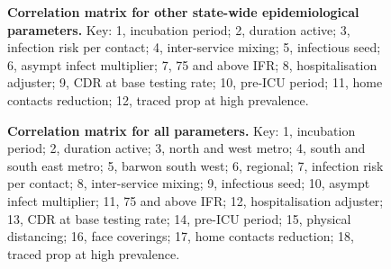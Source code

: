 \begin{figure}[ht]
\caption{\textbf{Correlation matrix for other state-wide epidemiological parameters.} Key: 1, incubation period; 2, duration active; 3, infection risk per contact; 4, inter-service mixing; 5, infectious seed; 6, asympt infect multiplier; 7, 75 and above IFR; 8, hospitalisation adjuster; 9, CDR at base testing rate; 10, pre-ICU period; 11, home contacts reduction; 12, traced prop at high prevalence.}
\end{figure}

\begin{figure}[ht]
\caption{\textbf{Correlation matrix for all parameters.} Key: 1, incubation period; 2, duration active; 3, north and west metro; 4, south and south east metro; 5, barwon south west; 6, regional; 7, infection risk per contact; 8, inter-service mixing; 9, infectious seed; 10, asympt infect multiplier; 11, 75 and above IFR; 12, hospitalisation adjuster; 13, CDR at base testing rate; 14, pre-ICU period; 15, physical distancing; 16, face coverings; 17, home contacts reduction; 18, traced prop at high prevalence.}
\end{figure}

